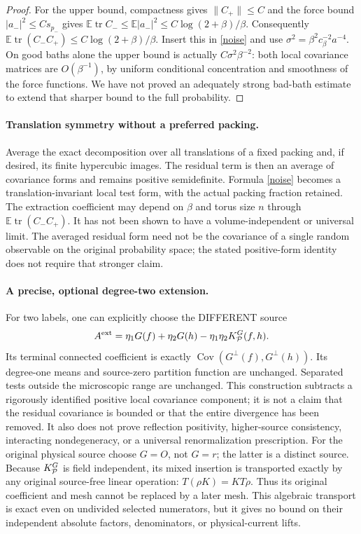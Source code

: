 \documentclass[11pt]{article}
\newcommand{\E}{\mathbb E}
\newcommand{\Cov}{\operatorname{Cov}}
\begin{document}
\begin{proof}
For the upper bound, compactness gives $\|C_+\|\le C$ and the force bound
$|a_-|^2\le C s_{p_-}$ gives
$\E\operatorname{tr}C_-\le \E|a_-|^2\le C\log(2+\beta)/\beta$.
Consequently $\E\operatorname{tr}(C_-C_+)\le C\log(2+\beta)/\beta$.
Insert this in \eqref{noise} and use $\sigma^2=\beta^2c_\beta^{-2}a^{-4}$.
On good baths alone the upper bound is actually $C\sigma^2\beta^{-2}$:
both local covariance matrices are $O(\beta^{-1})$, by uniform conditional concentration
and smoothness of the force functions. We have not proved an adequately strong bad-bath
estimate to extend that sharper bound to the full probability.
\end{proof}

\paragraph{Translation symmetry without a preferred packing.}
Average the exact decomposition over all translations of a fixed packing and, if desired,
its finite hypercubic images. The residual term is then an average of covariance forms
and remains positive semidefinite. Formula \eqref{noise} becomes a translation-invariant
local test form, with the actual packing fraction retained. The extraction coefficient
may depend on $\beta$ and torus size $n$ through $\E\operatorname{tr}(C_-C_+)$.
It has not been shown to have a volume-independent or universal limit. The averaged
residual form need not be the covariance of a single random observable on the original
probability space; the stated positive-form identity does not require that stronger claim.

\paragraph{A precise, optional degree-two extension.}
For two labels, one can explicitly choose the DIFFERENT source
\[
 A^{\mathrm{ext}}=\eta_1G(f)+\eta_2G(h)-\eta_1\eta_2K_{\cal P}^G(f,h).
\]
Its terminal connected coefficient is exactly
$\Cov(G^\perp(f),G^\perp(h))$. Its degree-one means and source-zero partition
function are unchanged. Separated tests outside the microscopic range are unchanged.
This construction subtracts a rigorously identified positive local covariance component;
it is not a claim that the residual covariance is bounded or that the entire divergence
has been removed. It also does not prove reflection positivity, higher-source consistency,
interacting nondegeneracy, or a universal renormalization prescription.
For the original physical source choose $G=O$, not $G=r$; the latter is a distinct source.
Because $K_{\cal P}^G$ is field independent, its mixed insertion is transported exactly
by any original source-free linear operation: $T(\rho K)=K T\rho$.
Thus its original coefficient and mesh cannot be replaced by a later mesh.
This algebraic transport is exact even on undivided selected numerators, but it gives
no bound on their independent absolute factors, denominators, or physical-current lifts.
\end{document}
